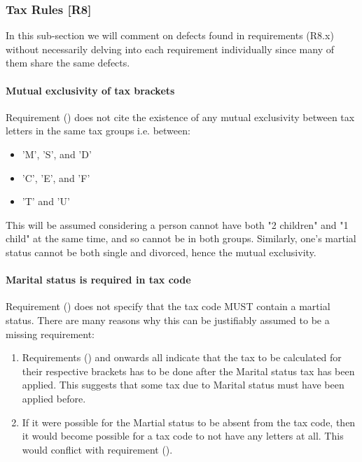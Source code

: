 \subsubsection{Tax Rules [R8]}

In this sub-section we will comment on defects found in requirements (R8.x) without necessarily delving into each requirement individually since many of them share the same defects. 
\par
\paragraph{Mutual exclusivity of tax brackets}
Requirement (\REightFour) does not cite the existence of any mutual exclusivity between tax letters in the same tax groups i.e. between: 
\begin{itemize}[noitemsep]
	\item 'M', 'S', and 'D' 
	\item 'C', 'E', and 'F'
	\item 'T' and 'U'
\end{itemize}
This will be assumed considering a person cannot have both "2 children" and "1 child" at the same time, and so cannot be in both groups. Similarly, one's martial status cannot be both single and divorced, hence the mutual exclusivity.  

\paragraph{Marital status is required in tax code}
Requirement (\REightFour) does not specify that the tax code MUST contain a martial status. There are many reasons why this can be justifiably assumed to be a missing requirement: 
\begin{enumerate}
	\item Requirements (\REightEight) and onwards all indicate that the tax to be calculated for their respective brackets has to be done after the Marital status tax has been applied. This suggests that some tax due to Marital status must have been applied before. 
	\item If it were possible for the Martial status to be absent from the tax code, then it would become possible for a tax code to not have any letters at all. This would conflict with requirement (\REightTwo). %
\end{enumerate}

